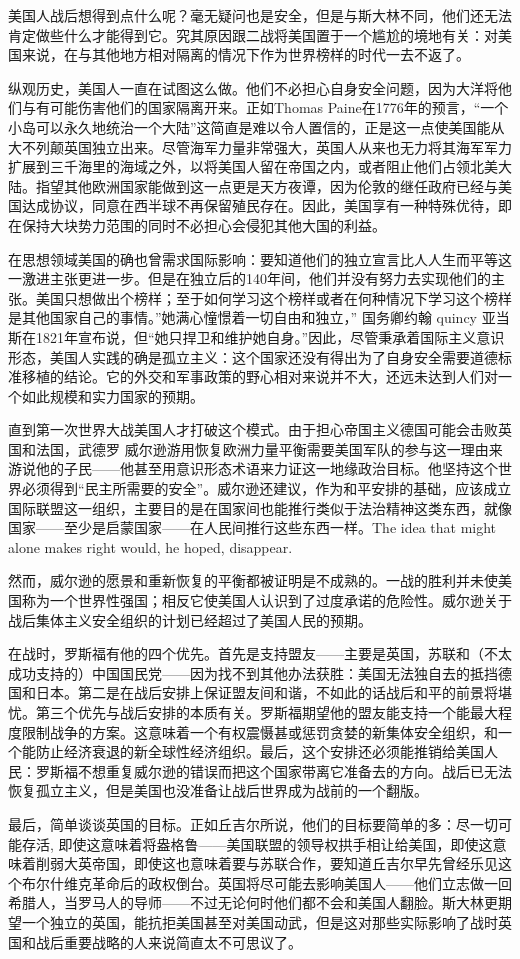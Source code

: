 美国人战后想得到点什么呢？毫无疑问也是安全，但是与斯大林不同，他们还无法肯定做些什么才能得到它。究其原因跟二战将美国置于一个尴尬的境地有关：对美国来说，在与其他地方相对隔离的情况下作为世界榜样的时代一去不返了。

纵观历史，美国人一直在试图这么做。他们不必担心自身安全问题，因为大洋将他们与有可能伤害他们的国家隔离开来。正如Thomas Paine在1776年的预言，“一个小岛可以永久地统治一个大陆”这简直是难以令人置信的，正是这一点使美国能从大不列颠英国独立出来。尽管海军力量非常强大，英国人从来也无力将其海军军力扩展到三千海里的海域之外，以将美国人留在帝国之内，或者阻止他们占领北美大陆。指望其他欧洲国家能做到这一点更是天方夜谭，因为伦敦的继任政府已经与美国达成协议，同意在西半球不再保留殖民存在。因此，美国享有一种特殊优待，即在保持大块势力范围的同时不必担心会侵犯其他大国的利益。

在思想领域美国的确也曾需求国际影响：要知道他们的独立宣言比人人生而平等这一激进主张更进一步。但是在独立后的140年间，他们并没有努力去实现他们的主张。美国只想做出个榜样；至于如何学习这个榜样或者在何种情况下学习这个榜样是其他国家自己的事情。”她满心憧憬着一切自由和独立，” 国务卿约翰 quincy 亚当斯在1821年宣布说，但“她只捍卫和维护她自身。”因此，尽管秉承着国际主义意识形态，美国人实践的确是孤立主义：这个国家还没有得出为了自身安全需要道德标准移植的结论。它的外交和军事政策的野心相对来说并不大，还远未达到人们对一个如此规模和实力国家的预期。

直到第一次世界大战美国人才打破这个模式。由于担心帝国主义德国可能会击败英国和法国，武德罗 威尔逊游用恢复欧洲力量平衡需要美国军队的参与这一理由来游说他的子民——他甚至用意识形态术语来力证这一地缘政治目标。他坚持这个世界必须得到“民主所需要的安全”。威尔逊还建议，作为和平安排的基础，应该成立国际联盟这一组织，主要目的是在国家间也能推行类似于法治精神这类东西，就像国家——至少是启蒙国家——在人民间推行这些东西一样。The idea that might alone makes right would, he hoped, disappear.

然而，威尔逊的愿景和重新恢复的平衡都被证明是不成熟的。一战的胜利并未使美国称为一个世界性强国；相反它使美国人认识到了过度承诺的危险性。威尔逊关于战后集体主义安全组织的计划已经超过了美国人民的预期。

在战时，罗斯福有他的四个优先。首先是支持盟友——主要是英国，苏联和（不太成功支持的）中国国民党——因为找不到其他办法获胜：美国无法独自去的抵挡德国和日本。第二是在战后安排上保证盟友间和谐，不如此的话战后和平的前景将堪忧。第三个优先与战后安排的本质有关。罗斯福期望他的盟友能支持一个能最大程度限制战争的方案。这意味着一个有权震慑甚或惩罚贪婪的新集体安全组织，和一个能防止经济衰退的新全球性经济组织。最后，这个安排还必须能推销给美国人民：罗斯福不想重复威尔逊的错误而把这个国家带离它准备去的方向。战后已无法恢复孤立主义，但是美国也没准备让战后世界成为战前的一个翻版。

最后，简单谈谈英国的目标。正如丘吉尔所说，他们的目标要简单的多：尽一切可能存活, 即使这意味着将盎格鲁——美国联盟的领导权拱手相让给美国，即使这意味着削弱大英帝国，即使这也意味着要与苏联合作，要知道丘吉尔早先曾经乐见这个布尔什维克革命后的政权倒台。英国将尽可能去影响美国人——他们立志做一回希腊人，当罗马人的导师——不过无论何时他们都不会和美国人翻脸。斯大林更期望一个独立的英国，能抗拒美国甚至对美国动武，但是这对那些实际影响了战时英国和战后重要战略的人来说简直太不可思议了。